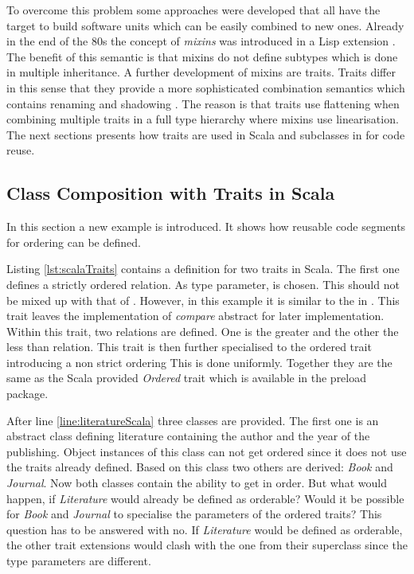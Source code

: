 To overcome this problem some approaches were developed that all
have the target to build software units which can be easily
combined to new ones. Already in the end of the 80s the concept of
\emph{mixins} was introduced
in a Lisp extension \cite{moon_object-oriented_1986}. The benefit
of this semantic is that mixins do not define subtypes which is
done in multiple inheritance. A further development of mixins are
traits. Traits differ in this sense that they provide a more
sophisticated combination semantics which contains renaming and shadowing
\cite{schaerli_traits:_2003}. The reason is that traits use flattening
when combining multiple traits in a full type hierarchy where mixins
use linearisation. The next sections presents how traits are used in
Scala and subclasses in \ooplss for code reuse.

\subsection{Class Composition with Traits in Scala}
In this section a new example is introduced. It shows how reusable code
segments for ordering can be defined.

Listing \ref{lst:scalaTraits} contains a definition for two traits
in Scala. The first one defines a strictly ordered relation. As type
parameter, \mytype is chosen. This should not be mixed up with that
of \ooplss. However, in this example it is similar to the \mytype
in \ooplss. This trait leaves the implementation of \emph{compare}
abstract for later implementation. Within this trait, two relations are
defined. One is the greater and the other the less than relation. This
trait is then further specialised to the ordered trait introducing a
non strict ordering This is done uniformly. Together they are the same
as the Scala provided \emph{Ordered} trait which is available in the
preload package.

After line \ref{line:literatureScala} three classes are provided. The
first one is an abstract class defining literature containing the author
and the year of the publishing. Object instances of this class can not
get ordered since it does not use the traits already defined. Based on
this class two others are derived: \emph{Book} and \emph{Journal}. Now
both classes contain the ability to get in order. But what would happen,
if \emph{Literature} would already be defined as orderable? Would
it be possible for \emph{Book} and \emph{Journal} to specialise the
parameters of the ordered traits? This question has to be answered with
no. If \emph{Literature} would be defined as orderable, the other trait
extensions would clash with the one from their superclass since the type
parameters are different.


